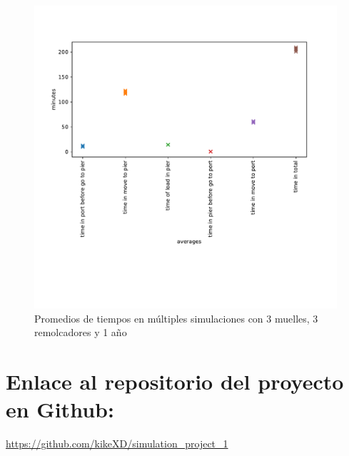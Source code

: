 \documentclass[titlepage,11pt]{scrartcl}
\begin{document}
	\begin{figure}[htb]
		\begin{center}
			\includegraphics[width=\columnwidth]{./figures/simulation_525600_3_3_10.pdf}
		\end{center}
		\caption{Promedios de tiempos en múltiples simulaciones con 3 muelles, 3 remolcadores y 1 año \label{fig:simulation_525600_3_3_10}}
	\end{figure}


\section{Enlace al repositorio del proyecto en Github:}
	\url{https://github.com/kikeXD/simulation_project_1}
\end{document}
